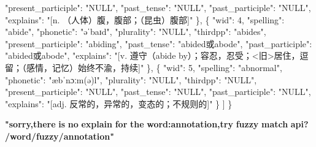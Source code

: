 \documentclass[
]{article}
\newenvironment{Shaded}{}{}
\newcommand{\DataTypeTok}[1]{\textcolor[rgb]{0.56,0.13,0.00}{#1}}
\newcommand{\DecValTok}[1]{\textcolor[rgb]{0.25,0.63,0.44}{#1}}
\newcommand{\ErrorTok}[1]{\textcolor[rgb]{1.00,0.00,0.00}{\textbf{#1}}}
\newcommand{\FunctionTok}[1]{\textcolor[rgb]{0.02,0.16,0.49}{#1}}
\newcommand{\OtherTok}[1]{\textcolor[rgb]{0.00,0.44,0.13}{#1}}
\newcommand{\StringTok}[1]{\textcolor[rgb]{0.25,0.44,0.63}{#1}}
\begin{document}
\begin{Shaded}
\begin{Highlighting}[]
      \DataTypeTok{"present\_participle"}\FunctionTok{:} \StringTok{"NULL"}\FunctionTok{,}
      \DataTypeTok{"past\_tense"}\FunctionTok{:} \StringTok{"NULL"}\FunctionTok{,}
      \DataTypeTok{"past\_participle"}\FunctionTok{:} \StringTok{"NULL"}\FunctionTok{,}
      \DataTypeTok{"explains"}\FunctionTok{:} \StringTok{"[\textquotesingle{}n. （人体）腹，腹部；（昆虫）腹部\textquotesingle{}]"}
    \FunctionTok{\}}\OtherTok{,}
    \FunctionTok{\{}
      \DataTypeTok{"wid"}\FunctionTok{:} \DecValTok{4}\FunctionTok{,}
      \DataTypeTok{"spelling"}\FunctionTok{:} \StringTok{"abide"}\FunctionTok{,}
      \DataTypeTok{"phonetic"}\FunctionTok{:} \StringTok{"əˈbaɪd"}\FunctionTok{,}
      \DataTypeTok{"plurality"}\FunctionTok{:} \StringTok{"NULL"}\FunctionTok{,}
      \DataTypeTok{"thirdpp"}\FunctionTok{:} \StringTok{"abides"}\FunctionTok{,}
      \DataTypeTok{"present\_participle"}\FunctionTok{:} \StringTok{"abiding"}\FunctionTok{,}
      \DataTypeTok{"past\_tense"}\FunctionTok{:} \StringTok{"abided或abode"}\FunctionTok{,}
      \DataTypeTok{"past\_participle"}\FunctionTok{:} \StringTok{"abided或abode"}\FunctionTok{,}
      \DataTypeTok{"explains"}\FunctionTok{:} \StringTok{"[\textquotesingle{}v. 遵守（abide by）；容忍，忍受；\textless{}旧\textgreater{}居住，逗留；（感情，记忆）始终不渝，持续\textquotesingle{}]"}
    \FunctionTok{\}}\OtherTok{,}
    \FunctionTok{\{}
      \DataTypeTok{"wid"}\FunctionTok{:} \DecValTok{5}\FunctionTok{,}
      \DataTypeTok{"spelling"}\FunctionTok{:} \StringTok{"abnormal"}\FunctionTok{,}
      \DataTypeTok{"phonetic"}\FunctionTok{:} \StringTok{"æbˈnɔːm(ə)l"}\FunctionTok{,}
      \DataTypeTok{"plurality"}\FunctionTok{:} \StringTok{"NULL"}\FunctionTok{,}
      \DataTypeTok{"thirdpp"}\FunctionTok{:} \StringTok{"NULL"}\FunctionTok{,}
      \DataTypeTok{"present\_participle"}\FunctionTok{:} \StringTok{"NULL"}\FunctionTok{,}
      \DataTypeTok{"past\_tense"}\FunctionTok{:} \StringTok{"NULL"}\FunctionTok{,}
      \DataTypeTok{"past\_participle"}\FunctionTok{:} \StringTok{"NULL"}\FunctionTok{,}
      \DataTypeTok{"explains"}\FunctionTok{:} \StringTok{"[\textquotesingle{}adj. 反常的，异常的，变态的；不规则的\textquotesingle{}]"}
    \FunctionTok{\}}
  \OtherTok{]}
\FunctionTok{\}}
\end{Highlighting}
\end{Shaded}

\begin{Shaded}
\begin{Highlighting}[]
\ErrorTok{"sorry,there} \ErrorTok{is} \ErrorTok{no} \ErrorTok{explain} \ErrorTok{for} \ErrorTok{the} \ErrorTok{word:annotation,try} \ErrorTok{fuzzy} \ErrorTok{match} \ErrorTok{api?} \ErrorTok{/word/fuzzy/annotation"}
\end{Highlighting}
\end{Shaded}
\end{document}
